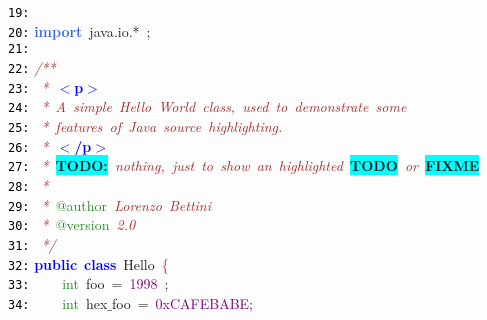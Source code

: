 \documentclass{article}
\begin{document}
\mbox{}\texttt{\textcolor{Black}{19:}}  \\
\mbox{}\texttt{\textcolor{Black}{20:}} \textbf{\textcolor{RoyalBlue}{import}}\ java\textcolor{BrickRed}{.}io\textcolor{BrickRed}{.*}\ \textcolor{BrickRed}{;} \\
\mbox{}\texttt{\textcolor{Black}{21:}}  \\
\mbox{}\texttt{\textcolor{Black}{22:}} \textit{\textcolor{Brown}{/**}} \\
\mbox{}\texttt{\textcolor{Black}{23:}} \textit{\textcolor{Brown}{\ *\ }}\textbf{\textcolor{Blue}{$<$p$>$}} \\
\mbox{}\texttt{\textcolor{Black}{24:}} \textit{\textcolor{Brown}{\ *\ A\ simple\ Hello\ World\ class,\ used\ to\ demonstrate\ some}} \\
\mbox{}\texttt{\textcolor{Black}{25:}} \textit{\textcolor{Brown}{\ *\ features\ of\ Java\ source\ highlighting.}} \\
\mbox{}\texttt{\textcolor{Black}{26:}} \textit{\textcolor{Brown}{\ *\ }}\textbf{\textcolor{Blue}{$<$/p$>$}} \\
\mbox{}\texttt{\textcolor{Black}{27:}} \textit{\textcolor{Brown}{\ *\ }}\textbf{\colorbox{Cyan}{TODO:}}\textit{\textcolor{Brown}{\ nothing,\ just\ to\ show\ an\ highlighted\ }}\textbf{\colorbox{Cyan}{TODO}}\textit{\textcolor{Brown}{\ or\ }}\textbf{\colorbox{Cyan}{FIXME}} \\
\mbox{}\texttt{\textcolor{Black}{28:}} \textit{\textcolor{Brown}{\ *}} \\
\mbox{}\texttt{\textcolor{Black}{29:}} \textit{\textcolor{Brown}{\ *\ }}\textcolor{ForestGreen}{@author}\textit{\textcolor{Brown}{\ Lorenzo\ Bettini}} \\
\mbox{}\texttt{\textcolor{Black}{30:}} \textit{\textcolor{Brown}{\ *\ }}\textcolor{ForestGreen}{@version}\textit{\textcolor{Brown}{\ 2.0}} \\
\mbox{}\texttt{\textcolor{Black}{31:}} \textit{\textcolor{Brown}{\ */}} \\
\mbox{}\texttt{\textcolor{Black}{32:}} \textbf{\textcolor{Blue}{public}}\ \textbf{\textcolor{Blue}{class}}\ Hello\ \textcolor{Red}{\{} \\
\mbox{}\texttt{\textcolor{Black}{33:}} \ \ \ \ \textcolor{ForestGreen}{int}\ foo\ \textcolor{BrickRed}{=}\ \textcolor{Purple}{1998}\ \textcolor{BrickRed}{;} \\
\mbox{}\texttt{\textcolor{Black}{34:}} \ \ \ \ \textcolor{ForestGreen}{int}\ hex$\_$foo\ \textcolor{BrickRed}{=}\ \textcolor{Purple}{0xCAFEBABE}\textcolor{BrickRed}{;} \\
\end{document}
